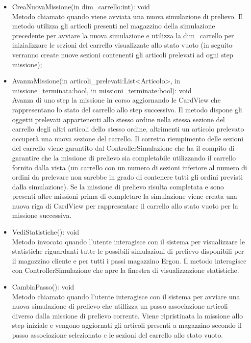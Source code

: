 \begin{itemize}
    \item CreaNuovaMissione(in dim\_carrello:int): void\\
    Metodo chiamato quando viene avviata una nuova simulazione di prelievo. Il metodo utilizza gli articoli presenti nel magazzino della simulazione precedente per avviare la nuova simulazione e utilizza 
    la dim\_carrello per inizializzare le sezioni del carrello visualizzate allo stato vuoto (in seguito verranno create nuove sezioni contenenti gli articoli prelevati ad ogni step missione);
    \item AvanzaMissione(in articoli\_prelevati:List<Articolo>, in missione\_terminata:bool, in missioni\_terminate:bool): void\\
    Avanza di uno step la missione in corso aggiornando le CardView che rappresentano lo stato del carrello allo step successivo.
    Il metodo dispone gli oggetti prelevati appartenenti allo stesso ordine nella stessa sezione del carrello degli altri articoli dello stesso ordine, altrimenti un articolo prelevato occuperà
    una nuova sezione del carrello. Il corretto riempimento delle sezioni del carrello viene garantito dal ControllerSimulazione che ha il compito di garantire che la missione di prelievo 
    sia completabile utilizzando il carrello fornito dalla vista (un carrello con un numero di sezioni inferiore al numero di ordini da prelevare non sarebbe in grado di contenere tutti gli ordini previsti dalla simulazione).
    Se la missione di prelievo risulta completata e sono presenti altre missioni prima di completare la simulazione viene creata una nuova riga di CardView per rappresentare il carrello allo stato 
    vuoto per la missione successiva.
    \item VediStatistiche(): void\\
    Metodo invocato quando l'utente interagisce con il sistema per visualizzare le statistiche riguardanti tutte le possibili simulazioni di prelievo disponibili per il magazzino cliente e per tutti i passi magazzino Ergon.
    Il metodo interagisce con ControllerSimulazione che apre la finestra di visualizzazione statistiche.
    \item CambiaPasso(): void\\
    Metodo chiamato quando l'utente interagisce con il sistema per avviare una nuova simulazione di prelievo che utillizza un passo associazione articoli diverso dalla missione di prelievo corrente.
    Viene ripristinata la missione allo step iniziale e vengono aggiornati gli articoli presenti a magazzino secondo il passo associazione selezionato e le sezioni del carrello allo stato vuoto.

\end{itemize}
